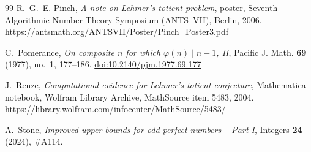 \documentclass[11pt,reqno]{amsart}
\numberwithin{equation}{section}
\theoremstyle{plain}
\theoremstyle{definition}
\theoremstyle{remark}
\begin{document}
\begin{thebibliography}{99}
R.~G.~E. Pinch,
\emph{A note on Lehmer's totient problem},
poster, Seventh Algorithmic Number Theory Symposium (ANTS~VII), Berlin, 2006.
\url{https://antsmath.org/ANTSVII/Poster/Pinch_Poster3.pdf}

C.~Pomerance,
\emph{On composite $n$ for which $\varphi(n)\mid n-1$, II},
Pacific J. Math. \textbf{69} (1977), no.~1, 177--186.
\href{https://doi.org/10.2140/pjm.1977.69.177}{doi:10.2140/pjm.1977.69.177}

J.~Renze,
\emph{Computational evidence for Lehmer's totient conjecture},
Mathematica notebook, Wolfram Library Archive, MathSource item 5483, 2004.
\url{https://library.wolfram.com/infocenter/MathSource/5483/}

A.~Stone,
\emph{Improved upper bounds for odd perfect numbers -- Part I},
Integers \textbf{24} (2024), \#A114.

\end{thebibliography}
\end{document}

